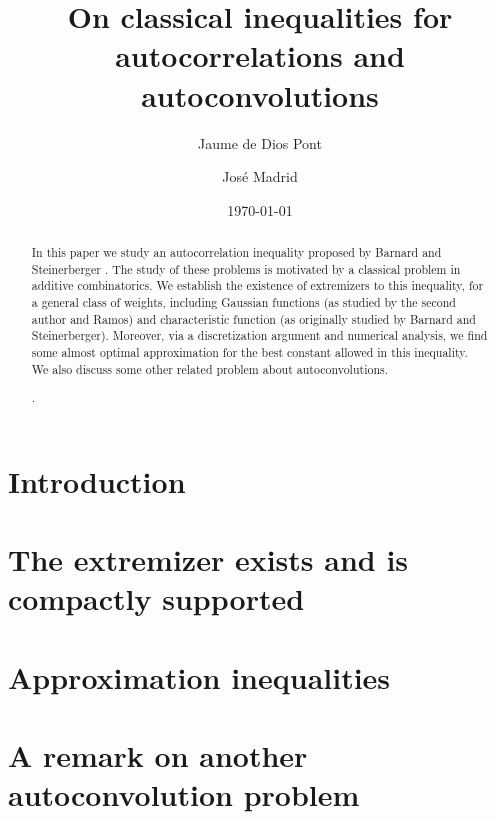 \documentclass[10pt,reqno]{amsart}
\title{On classical inequalities for autocorrelations and autoconvolutions
}
\author{Jaume de Dios Pont}
\author[Jos\'e Madrid]{Jos\'e Madrid}
\date{\today}
\begin{document}
	\maketitle
	
\begin{abstract}
In this paper we study an autocorrelation inequality proposed by Barnard and Steinerberger \cite{BarnardSteinerberger}. The study of these problems is motivated by a classical problem in additive combinatorics. We establish the existence of extremizers to this inequality, for a general class of weights, including Gaussian functions (as studied by the second author and Ramos) and characteristic function (as originally studied by Barnard and Steinerberger). Moreover, via a discretization argument and numerical analysis, we find some almost optimal approximation for the best constant allowed in this inequality. We also discuss some other related problem about autoconvolutions.


 .
\end{abstract}	
	
	
	
\section{Introduction}



\section{The extremizer exists and is compactly supported}


\section{Approximation inequalities}





\section{A remark on another autoconvolution problem}

\end{document}
